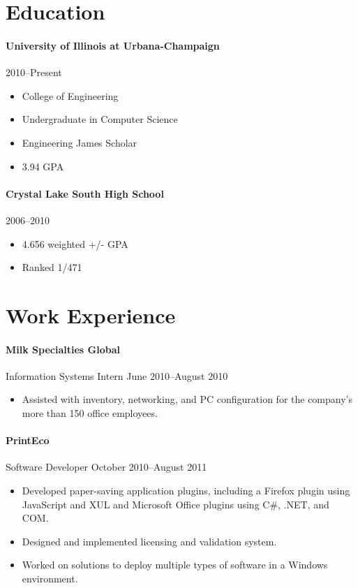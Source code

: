 \documentclass[letterpaper,12pt]{article}
\begin{document}
\section*{Education}
\paragraph{University of Illinois at Urbana-Champaign}
\hfill 2010--Present
\begin{multicols}{2}
\begin{itemize}
\item College of Engineering
\item Undergraduate in Computer Science
\item Engineering James Scholar
\item 3.94 GPA
\end{itemize}
\end{multicols}

\paragraph{Crystal Lake South High School}
\hfill 2006--2010
\begin{multicols}{2}
\begin{itemize}
\item 4.656 weighted +/- GPA
\item Ranked 1/471
\end{itemize}
\end{multicols}


\section*{Work Experience}
\paragraph {Milk Specialties Global}
Information Systems Intern \hfill June 2010--August 2010
\begin{itemize}
\item Assisted with inventory, networking, and PC configuration
for the company's more than 150 office employees.
\end{itemize}

\paragraph{PrintEco}
Software Developer \hfill October 2010--August 2011
\begin{itemize}
\item Developed paper-saving application plugins,
including a Firefox plugin using JavaScript and XUL
and Microsoft Office plugins using C\#, .NET, and COM.
\item Designed and implemented licensing and validation system.
\item Worked on solutions to deploy multiple types of software
in a Windows environment.
\end{itemize}
\end{document}
